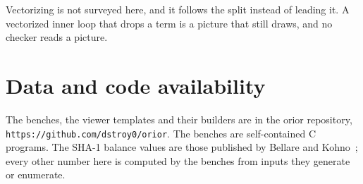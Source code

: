 Vectorizing is not surveyed here, and it follows the split instead of leading it. A vectorized inner loop that drops a term is a picture that still draws, and no checker reads a picture.

\section{Data and code availability}

The benches, the viewer templates and their builders are in the orior repository, \texttt{https://github.com/dstroy0/orior}. The benches are self-contained C programs. The SHA-1 balance values are those published by Bellare and Kohno~\cite{src:Bellare-and-Kohno-2004}; every other number here is computed by the benches from inputs they generate or enumerate.
